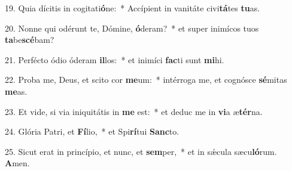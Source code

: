 19. Quia dícitis in cogitati\textbf{ó}ne:~*  Accípient in vanitáte civi\textbf{tá}tes \textbf{tu}as.\

20. Nonne qui odérunt te, Dómine, \textbf{ó}deram?~*  et super inimícos tuos \textbf{ta}be\textbf{scé}bam?\

21. Perfécto ódio óderam \textbf{il}los:~*  et inimíci \textbf{fac}ti sunt \textbf{mi}hi.\

22. Proba me, Deus, et scito cor \textbf{me}um:~*  intérroga me, et cognósce \textbf{sé}mitas \textbf{me}as.\

23. Et vide, si via iniquitátis in \textbf{me} est:~*  et deduc me in \textbf{vi}a æ\textbf{tér}na.\

24. Glória Patri, et \textbf{Fí}lio,~*  et Spi\textbf{rí}tui \textbf{Sanc}to.\

25. Sicut erat in princípio, et nunc, et \textbf{sem}per,~*  et in sǽcula sæcu\textbf{ló}rum. \textbf{A}men.\

